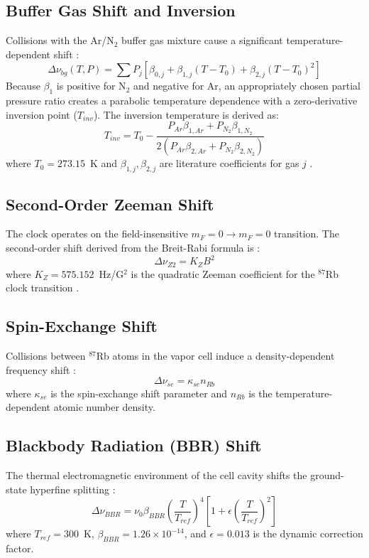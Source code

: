 \documentclass[11pt,a4paper]{article}
\begin{document}
\subsection{Buffer Gas Shift and Inversion}
Collisions with the Ar/N$_2$ buffer gas mixture cause a significant temperature-dependent shift \cite{Vanier2005, Kozlova2011}:
\begin{equation}
\Delta\nu_{bg}(T, P) = \sum P_j \left[ \beta_{0,j} + \beta_{1,j} (T-T_0) + \beta_{2,j} (T-T_0)^2 \right]
\end{equation}
Because $\beta_1$ is positive for N$_2$ and negative for Ar, an appropriately chosen partial pressure ratio creates a parabolic temperature dependence with a zero-derivative inversion point ($T_{inv}$). The inversion temperature is derived as:
\begin{equation}
T_{inv} = T_0 - \frac{P_{Ar} \beta_{1,Ar} + P_{N_2} \beta_{1,N_2}}{2(P_{Ar} \beta_{2,Ar} + P_{N_2} \beta_{2,N_2})}
\end{equation}
where $T_0 = 273.15$~K and $\beta_{1,j}, \beta_{2,j}$ are literature coefficients for gas $j$ \cite{Kozlova2011}.

\subsection{Second-Order Zeeman Shift}
The clock operates on the field-insensitive $m_F=0 \to m_F=0$ transition. The second-order shift derived from the Breit-Rabi formula is \cite{Vanier1989}:
\begin{equation}
\Delta\nu_{Z2} = K_Z B^2
\end{equation}
where $K_Z = 575.152$~Hz/G$^2$ is the quadratic Zeeman coefficient for the $^{87}$Rb clock transition \cite{Vanier1989}.

\subsection{Spin-Exchange Shift}
Collisions between $^{87}$Rb atoms in the vapor cell induce a density-dependent frequency shift \cite{Allard2004}:
\begin{equation}
\Delta\nu_{se} = \kappa_{se} n_{Rb}
\end{equation}
where $\kappa_{se}$ is the spin-exchange shift parameter and $n_{Rb}$ is the temperature-dependent atomic number density.

\subsection{Blackbody Radiation (BBR) Shift}
The thermal electromagnetic environment of the cell cavity shifts the ground-state hyperfine splitting \cite{Bize1999}:
\begin{equation}
\Delta\nu_{BBR} = \nu_0 \beta_{BBR} \left( \frac{T}{T_{ref}} \right)^4 \left[ 1 + \epsilon \left( \frac{T}{T_{ref}} \right)^2 \right]
\end{equation}
where $T_{ref} = 300$~K, $\beta_{BBR} = 1.26 \times 10^{-14}$, and $\epsilon = 0.013$ is the dynamic correction factor.
\end{document}
